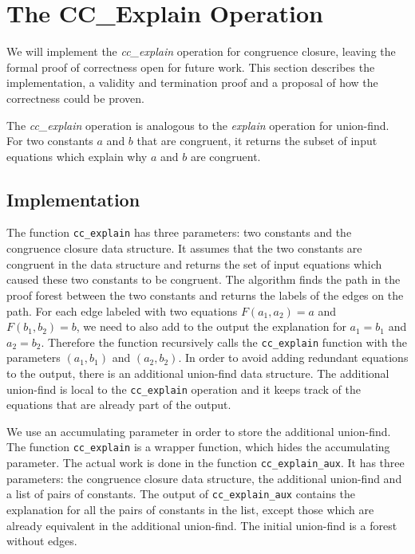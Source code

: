 \chapter{The CC\_Explain Operation}

We will implement the \emph{cc\_explain} operation for congruence closure, leaving the formal proof of correctness open for future work.  This section describes the implementation, a validity and termination proof and a proposal of how the correctness could be proven.

The \emph{cc\_explain} operation is analogous to the \emph{explain} operation for union-find. For two constants $a$ and $b$ that are congruent, it returns the subset of input equations which explain why $a$ and $b$ are congruent.

\section{Implementation}

The function \lstinline{cc_explain} has three parameters: two constants and the congruence closure data structure.
It assumes that the two constants are congruent in the data structure and returns the set of input equations which caused these two constants to be congruent. The algorithm finds the path in the proof forest between the two constants and returns the labels of the edges on the path. For each edge labeled with two equations $F(a_1, a_2) = a$ and $F(b_1, b_2) = b$, we need to also add to the output the explanation for $a_1 = b_1$ and $a_2 = b_2$. Therefore the function recursively calls the \lstinline{cc_explain} function with the parameters $(a_1, b_1)$ and $(a_2, b_2)$. In order to avoid adding redundant equations to the output, there is an additional union-find data structure. The additional union-find is local to the \lstinline{cc_explain} operation and it keeps track of the equations that are already part of the output.

We use an accumulating parameter in order to store the additional union-find. The function \lstinline|cc_explain| is a wrapper function, which hides the accumulating parameter. The actual work is done in the function \lstinline|cc_explain_aux|.
It has three parameters: the congruence closure data structure, the additional union-find and a list of pairs of constants. The output of \lstinline{cc_explain_aux} contains the explanation for all the pairs of constants in the list, except those which are already equivalent in the additional union-find. The initial union-find is a forest without edges.

